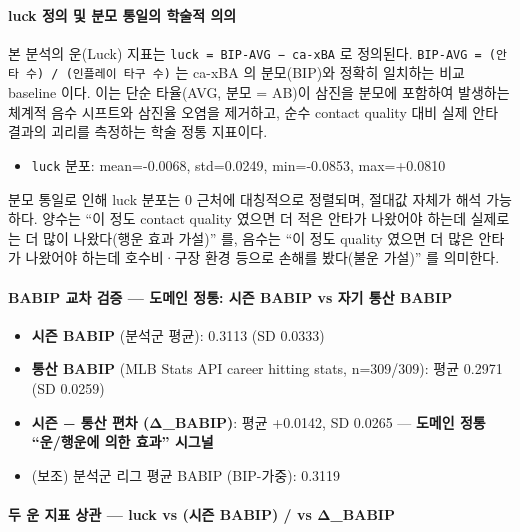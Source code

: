 \documentclass[
  11.5pt,
]{article}
\providecommand{\tightlist}{%
  \setlength{\itemsep}{0pt}\setlength{\parskip}{0pt}}
\begin{document}
\paragraph{luck 정의 및 분모 통일의 학술적
의의}\label{luck-uxc815uxc758-uxbc0f-uxbd84uxbaa8-uxd1b5uxc77cuxc758-uxd559uxc220uxc801-uxc758uxc758}

본 분석의 운(Luck) 지표는 \texttt{luck\ =\ BIP-AVG\ −\ ca-xBA} 로
정의된다. \texttt{BIP-AVG\ =\ (안타\ 수)\ /\ (인플레이\ 타구\ 수)} 는
ca-xBA 의 분모(BIP)와 정확히 일치하는 비교 baseline 이다. 이는 단순
타율(AVG, 분모 = AB)이 삼진을 분모에 포함하여 발생하는 체계적 음수
시프트와 삼진율 오염을 제거하고, 순수 contact quality 대비 실제 안타
결과의 괴리를 측정하는 학술 정통 지표이다.

\begin{itemize}
\tightlist
\item
  \texttt{luck} 분포: mean=-0.0068, std=0.0249, min=-0.0853, max=+0.0810
\end{itemize}

분모 통일로 인해 luck 분포는 0 근처에 대칭적으로 정렬되며, 절대값 자체가
해석 가능하다. 양수는 ``이 정도 contact quality 였으면 더 적은 안타가
나왔어야 하는데 실제로는 더 많이 나왔다(행운 효과 가설)'' 를, 음수는
``이 정도 quality 였으면 더 많은 안타가 나왔어야 하는데 호수비·구장 환경
등으로 손해를 봤다(불운 가설)'' 를 의미한다.

\paragraph{BABIP 교차 검증 --- 도메인 정통: 시즌 BABIP vs 자기 통산
BABIP}\label{babip-uxad50uxcc28-uxac80uxc99d-uxb3c4uxba54uxc778-uxc815uxd1b5-uxc2dcuxc98c-babip-vs-uxc790uxae30-uxd1b5uxc0b0-babip}

\begin{itemize}
\tightlist
\item
  \textbf{시즌 BABIP} (분석군 평균): 0.3113 (SD 0.0333)
\item
  \textbf{통산 BABIP} (MLB Stats API career hitting stats, n=309/309):
  평균 0.2971 (SD 0.0259)
\item
  \textbf{시즌 − 통산 편차 (Δ\_BABIP)}: 평균 +0.0142, SD 0.0265 ---
  \textbf{도메인 정통 ``운/행운에 의한 효과'' 시그널}
\item
  (보조) 분석군 리그 평균 BABIP (BIP-가중): 0.3119
\end{itemize}

\paragraph{두 운 지표 상관 --- luck vs (시즌 BABIP) / vs
Δ\_BABIP}\label{uxb450-uxc6b4-uxc9c0uxd45c-uxc0c1uxad00-luck-vs-uxc2dcuxc98c-babip-vs-ux3b4_babip}
\end{document}
